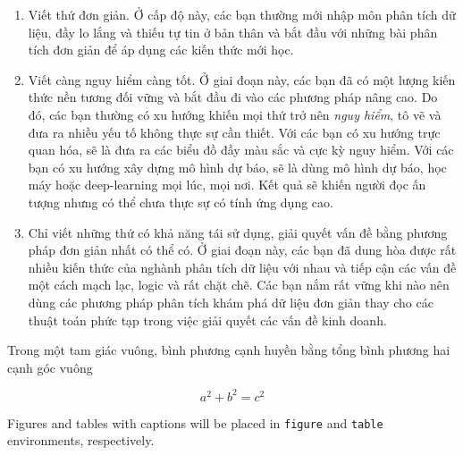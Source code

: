 \documentclass[]{krantz}
\makeatletter
\newenvironment{Shaded}{\begin{snugshade}}{\end{snugshade}}
\newcommand{\DataTypeTok}[1]{\textcolor[rgb]{0.27,0.27,0.27}{#1}}
\newcommand{\KeywordTok}[1]{\textcolor[rgb]{0.27,0.27,0.27}{\textbf{#1}}}
\newcommand{\NormalTok}[1]{#1}
\newcommand{\OperatorTok}[1]{\textcolor[rgb]{0.43,0.43,0.43}{\textbf{#1}}}
\newcommand{\StringTok}[1]{\textcolor[rgb]{0.5,0.5,0.5}{#1}}
\providecommand{\tightlist}{%
  \setlength{\itemsep}{0pt}\setlength{\parskip}{0pt}}
\newenvironment{kframe}{%
\medskip{}
\setlength{\fboxsep}{.8em}
 \def\at@end@of@kframe{}%
 \ifinner\ifhmode%
  \def\at@end@of@kframe{\end{minipage}}%
  \begin{minipage}{\columnwidth}%
 \fi\fi%
 \def\FrameCommand##1{\hskip\@totalleftmargin \hskip-\fboxsep
 \colorbox{shadecolor}{##1}\hskip-\fboxsep
     \hskip-\linewidth \hskip-\@totalleftmargin \hskip\columnwidth}%
 \MakeFramed {\advance\hsize-\width
   \@totalleftmargin\z@ \linewidth\hsize
   \@setminipage}}%
 {\par\unskip\endMakeFramed%
 \at@end@of@kframe}
\renewenvironment{Shaded}{\begin{kframe}}{\end{kframe}}
\renewenvironment{Shaded}{\begin{snugshade}}{\end{snugshade}}
\renewcommand{\DataTypeTok}[1]{\textcolor[rgb]{0.13,0.29,0.53}{#1}}
\renewcommand{\KeywordTok}[1]{\textcolor[rgb]{0.13,0.29,0.53}{\textbf{#1}}}
\renewcommand{\NormalTok}[1]{#1}
\renewcommand{\OperatorTok}[1]{\textcolor[rgb]{0.81,0.36,0.00}{\textbf{#1}}}
\renewcommand{\StringTok}[1]{\textcolor[rgb]{0.31,0.60,0.02}{#1}}
\theoremstyle{definition}
\theoremstyle{definition}
\theoremstyle{definition}
\theoremstyle{remark}
\let\BeginKnitrBlock\begin \let\EndKnitrBlock\end
\makeatother
\begin{document}
\begin{enumerate}
\def\labelenumi{\arabic{enumi}.}
\tightlist
\item
  Viết thứ đơn giản. Ở cấp độ này, các bạn thường mới nhập môn phân tích
  dữ liệu, đầy lo lắng và thiếu tự tin ở bản thân và bắt đầu với những
  bài phân tích đơn giản để áp dụng các kiến thức mới học.
\item
  Viết càng nguy hiểm càng tốt. Ở giai đoạn này, các bạn đã có một lượng
  kiến thức nền tương đối vững và bắt đầu đi vào các phương pháp nâng
  cao. Do đó, các bạn thường có xu hướng khiến mọi thứ trở nên
  \emph{nguy hiểm}, tô vẽ và đưa ra nhiều yếu tố không thực sự cần
  thiết. Với các bạn có xu hướng trực quan hóa, sẽ là đưa ra các biểu đồ
  đầy màu sắc và cực kỳ nguy hiểm. Với các bạn có xu hướng xây dựng mô
  hình dự báo, sẽ là dùng mô hình dự báo, học máy hoặc deep-learning mọi
  lúc, mọi nơi. Kết quả sẽ khiến người đọc ấn tượng nhưng có thể chưa
  thực sự có tính ứng dụng cao.
\item
  Chỉ viết những thứ có khả năng tái sử dụng, giải quyết vấn đề bằng
  phương pháp đơn giản nhất có thể có. Ở giai đoạn này, các bạn đã dung
  hòa được rất nhiều kiến thức của nghành phân tích dữ liệu với nhau và
  tiếp cận các vấn đề một cách mạch lạc, logic và rất chặt chẽ. Các bạn
  nắm rất vững khi nào nên dùng các phương pháp phân tích khám phá dữ
  liệu đơn giản thay cho các thuật toán phức tạp trong việc giải quyết
  các vấn đề kinh doanh.
\end{enumerate}

\BeginKnitrBlock{theorem}[Pytago]
\protect\hypertarget{thm:unnamed-chunk-4}{}{\label{thm:unnamed-chunk-4}
{} }Trong một tam giác vuông, bình phương cạnh
huyền bằng tổng bình phương hai cạnh góc vuông

\[a^2 + b^2 = c^2\]
\EndKnitrBlock{theorem}

Figures and tables with captions will be placed in \texttt{figure} and
\texttt{table} environments, respectively.

\begin{Shaded}
\end{Shaded}
\end{document}
